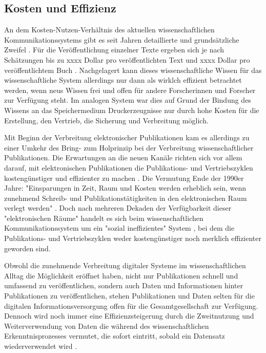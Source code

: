 \subsection{Kosten und Effizienz}

An dem Kosten-Nutzen-Verhältnis des aktuellen wissenschaftlichen Kommunikationssystems gibt es seit Jahren detaillierte und grundsätzliche Zweifel \cite{suchen}. Für die Veröffentlichung einzelner Texte ergeben sich je nach Schätzungen bis zu xxxx Dollar pro veröffentlichten Text und xxxx Dollar pro veröffentlichtem Buch \cite{suchen}. Nachgelagert kann dieses wissenschaftliche Wissen für das wissenschaftliche System allerdings nur dann als wirklch effizient betrachtet werden, wenn neus Wissen frei und offen für andere Forscherinnen und Forscher zur Verfügung steht. Im analogen System war dies auf Grund der Bindung des Wissens an das Speichermedium Druckerzeugnisse nur durch hohe Kosten für die Erstellung, den Vertrieb, die Sicherung und Verbreitung möglich.

Mit Beginn der Verbreitung elektronischer Publikationen kam es allerdings zu einer Umkehr des Bring- zum Holprinzip bei der Verbreitung wissenschaftlicher Publikationen. Die Erwartungen an die neuen Kanäle richten sich vor allem darauf, mit elektronischen Publikationen die Publikations- und Vertriebszyklen kostengünstiger und effizienter zu machen \cite{Brueggemann-Klein_1995}. Die Vermutung Ende der 1990er Jahre: "Einsparungen in Zeit, Raum und Kosten werden erheblich sein, wenn zunehmend Schreib- und Publikationstätigkeiten in den elektronischen Raum verlegt werden" \cite{roberts_1999_scholarly}. Doch nach mehreren Dekaden der Verfügbarkeit dieser "elektronischen Räume" handelt es sich beim wissenschaftlichen Kommunikationssystem um ein "sozial ineffizientes" System \cite[:47]{mueller-langer_2010}, bei dem die Publikations- und Vertriebszyklen weder kostengünstiger noch merklich effizienter geworden sind.

Obwohl die zunehmende Verbreitung digitaler Systeme im wissenschaftlichen Alltag die Möglichkeit eröffnet haben, nicht nur Publikationen schnell und umfassend zu veröffentlichen, sondern auch Daten und Informationen hinter Publikationen zu veröffentlichen, stehen Publikationen und Daten selten für die digitalen Informationsversorgung offen für die Gesamtgesellschaft zur Verfügung. Dennoch wird noch immer eine Effizienzsteigerung durch die Zweitnutzung und Weiterverwendung von Daten die während des wissenschaftlichen Erkenntnisprozesses vermutet, die sofort eintritt, sobald ein Datensatz wiederverwendet wird \cite{RIN_2010_open_research}.

